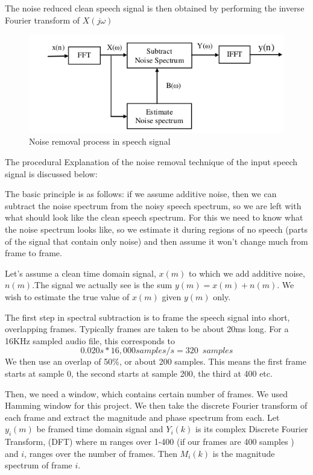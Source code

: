 The noise reduced clean speech signal is then obtained by performing the inverse Fourier transform of $X(j\omega)$
\begin{figure}[h]
	\begin{center}
		\includegraphics[width=6in]{images/noise.png}
		\caption{Noise removal process in speech signal}
		\label{noise}
	\end{center}
\end{figure}


The procedural Explanation of the noise removal technique of the input speech signal is discussed below:

The basic principle is as follows: if we assume additive noise, then we can subtract the noise spectrum from the noisy speech spectrum, so we are left with what should look like the clean speech spectrum. For this we need to know what the noise spectrum looks like, so we estimate it during regions of no speech (parts of the signal that contain only noise) and then assume it won't change much from frame to frame.

Let's assume a clean time domain signal, $x(m)$ to which we add additive noise, $n(m)$.The signal we actually see is the sum $y(m) = x(m) + n(m)$. We wish to estimate the true value of $x(m)$ given $y(m)$ only.

The first step in spectral subtraction is to frame the speech signal into short, overlapping frames. Typically frames are taken to be about 20ms long. For a 16KHz sampled audio file, this corresponds to $$0.020s * 16,000 samples/s = 320\enspace samples$$ We then use an overlap of 50\%, or about 200 samples. This means the first frame starts at sample 0, the second starts at sample 200, the third at 400 etc.

Then, we need a window, which contains certain number of frames. We used Hamming window for this project. We then take the discrete Fourier transform of each frame and extract the magnitude and phase spectrum from each. Let $y_i(m)$ be framed time domain signal and $Y_i(k)$ is its complex Discrete Fourier Transform, (DFT) where m ranges over 1-400 (if our frames are 400 samples ) and $i$,  ranges over the number of frames. Then $M_i(k)$ is the magnitude spectrum of frame $i$.

